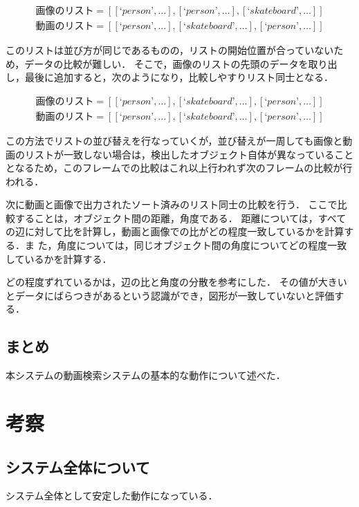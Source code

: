 \documentclass[a4j,12pt,dvipdfmx]{jreport}
\begin{document}
\begin{eqnarray}
  \label{eq:object_list_before_sort}
  画像のリスト = [[‘person’, …], [‘person’, …], [‘skateboard’, …]] \\
  動画のリスト = [[‘person’, …], [‘skateboard’, …], [‘person’, …]]
\end{eqnarray}

このリストは並び方が同じであるものの，リストの開始位置が合っていないため，データの比較が難しい．
そこで，画像のリストの先頭のデータを取り出し，最後に追加すると，次のようになり，比較しやすりリスト同士となる．

\begin{eqnarray}
  \label{eq:object_list_after_sort}
  画像のリスト = [[‘person’, …], [‘skateboard’, …], [‘person’, …]]\\
  動画のリスト = [[‘person’, …], [‘skateboard’, …], [‘person’, …]]
\end{eqnarray}

この方法でリストの並び替えを行なっていくが，並び替えが一周しても画像と動画のリストが一致しない場合は，検出したオブジェクト自体が異なっていることとなるため，このフレームでの比較はこれ以上行われず次のフレームの比較が行われる．

次に動画と画像で出力されたソート済みのリスト同士の比較を行う．
ここで比較することは，オブジェクト間の距離，角度である．
距離については，すべての辺に対して比を計算し，動画と画像での比がどの程度一致しているかを計算する．ま
た，角度については，同じオブジェクト間の角度についてどの程度一致しているかを計算する．

どの程度ずれているかは，辺の比と角度の分散を参考にした．
その値が大きいとデータにばらつきがあるという認識ができ，図形が一致していないと評価する．


\section{まとめ}
本システムの動画検索システムの基本的な動作について述べた．

\clearpage

\chapter{考察}
\label{sec:consideration}

\section{システム全体について}
システム全体として安定した動作になっている．
\end{document}
